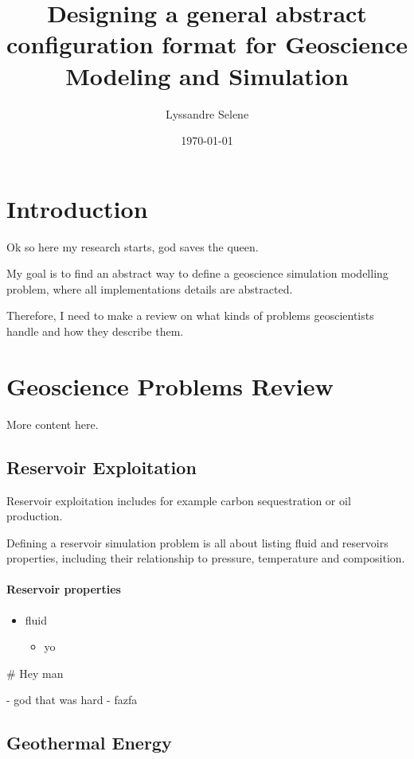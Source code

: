 \documentclass{article} %
\title{Designing a general abstract configuration format for Geoscience Modeling and Simulation}
\author{Lyssandre Selene}
\date{\today}
\begin{document}

\maketitle %

\section{Introduction} %
Ok so here my research starts, god saves the queen.

My goal is to find an abstract way to define a geoscience simulation modelling problem,
where all implementations details are abstracted.

Therefore, I need to make a review on what kinds of problems geoscientists handle and how they describe them.

\section{Geoscience Problems Review}
More content here. 

\subsection{Reservoir Exploitation}
Reservoir exploitation includes for example carbon sequestration or oil production.

Defining a reservoir simulation problem is all about listing fluid and reservoirs properties, 
including their relationship to pressure, temperature and composition. \cite{reservoir-review}


\paragraph{Reservoir properties}
\begin{itemize}
  \item fluid 
    \begin{itemize}
      \item yo
    
  \end{itemize} 
\end{itemize}

\begin{markdown}
# Hey man

- god that was hard
  - fazfa


\end{markdown}


\subsection{Geothermal Energy}


\printbibliography
\end{document}
